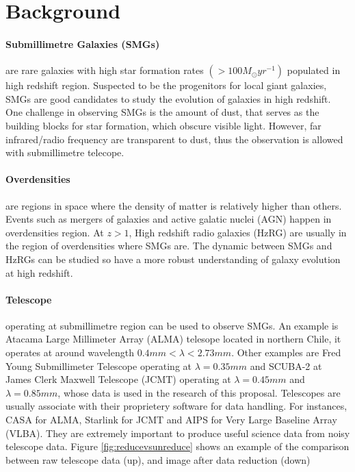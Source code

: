 \documentclass{article}
\begin{document}
\section{Background}

\paragraph{Submillimetre Galaxies (SMGs)} are rare galaxies with high star formation rates $(>100M_\odot yr^{-1})$ \cite{DaCunha2021} populated in high redshift region. Suspected to be the progenitors for local giant galaxies, SMGs are good candidates to study the evolution of galaxies in high redshift. One challenge in observing SMGs is the amount of dust, that serves as the building blocks for star formation, which obscure visible light. However, far infrared/radio frequency are transparent to dust, thus the observation is allowed with submillimetre telecope. 

\paragraph{Overdensities} are regions in space where the density of matter is relatively higher than others. Events such as mergers of galaxies and active galatic nuclei (AGN) happen in overdensities region. At $z>1$, High redshift radio galaxies (HzRG) are usually in the region of overdensities where SMGs are. The dynamic between SMGs and HzRGs can be studied so have a more robust understanding of galaxy evolution at high redshift.

\paragraph{Telescope} operating at submillimetre region can be used to observe SMGs. An example is Atacama Large Millimeter Array (ALMA) telesope located in northern Chile, it operates at around wavelength $ 0.4mm < \lambda < 2.73mm$. Other examples are Fred Young Submillimeter Telescope operating at $\lambda=0.35mm$ and SCUBA-2 at James Clerk Maxwell Telescope (JCMT) operating at $\lambda=0.45mm$ and $\lambda=0.85mm$, whose data is used in the research of this proposal. Telescopes are usually associate with their proprietery software for data handling. For instances, CASA for ALMA, Starlink for JCMT and AIPS for Very Large Baseline Array (VLBA). They are extremely important to produce useful science data from noisy telescope data. Figure \ref{fig:reducevsunreduce} shows an example of the comparison between raw telescope data (up), and image after data reduction (down) 
\end{document}
